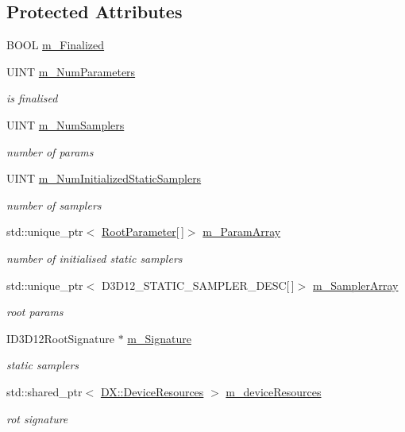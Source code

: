 \subsection*{Protected Attributes}
\begin{DoxyCompactItemize}
\item 
B\+O\+OL \mbox{\hyperlink{class_root_signature_a87564a512da9c0d3d6ca159dca0bc52b}{m\+\_\+\+Finalized}}
\item 
U\+I\+NT \mbox{\hyperlink{class_root_signature_a2f4c499d12d76b357853b100ebb6d8fa}{m\+\_\+\+Num\+Parameters}}
\begin{DoxyCompactList}\small\item\em is finalised \end{DoxyCompactList}\item 
U\+I\+NT \mbox{\hyperlink{class_root_signature_a1c558da623e1304988f56e78e957ac34}{m\+\_\+\+Num\+Samplers}}
\begin{DoxyCompactList}\small\item\em number of params \end{DoxyCompactList}\item 
U\+I\+NT \mbox{\hyperlink{class_root_signature_a4512fb5980e654113a04e4aff00e8bd7}{m\+\_\+\+Num\+Initialized\+Static\+Samplers}}
\begin{DoxyCompactList}\small\item\em number of samplers \end{DoxyCompactList}\item 
std\+::unique\+\_\+ptr$<$ \mbox{\hyperlink{class_root_parameter}{Root\+Parameter}}\mbox{[}$\,$\mbox{]}$>$ \mbox{\hyperlink{class_root_signature_a4b0c1a56f8fe468fc8ca30dccf490eaa}{m\+\_\+\+Param\+Array}}
\begin{DoxyCompactList}\small\item\em number of initialised static samplers \end{DoxyCompactList}\item 
std\+::unique\+\_\+ptr$<$ D3\+D12\+\_\+\+S\+T\+A\+T\+I\+C\+\_\+\+S\+A\+M\+P\+L\+E\+R\+\_\+\+D\+E\+SC\mbox{[}$\,$\mbox{]}$>$ \mbox{\hyperlink{class_root_signature_a7fea24906a1437ca55aaac9a8f6cc2f4}{m\+\_\+\+Sampler\+Array}}
\begin{DoxyCompactList}\small\item\em root params \end{DoxyCompactList}\item 
I\+D3\+D12\+Root\+Signature $\ast$ \mbox{\hyperlink{class_root_signature_a9c2454e65f7e2512952ab74c967572d3}{m\+\_\+\+Signature}}
\begin{DoxyCompactList}\small\item\em static samplers \end{DoxyCompactList}\item 
std\+::shared\+\_\+ptr$<$ \mbox{\hyperlink{class_d_x_1_1_device_resources}{D\+X\+::\+Device\+Resources}} $>$ \mbox{\hyperlink{class_root_signature_a6232742884741b5e773d00fee5e9c4ba}{m\+\_\+device\+Resources}}
\begin{DoxyCompactList}\small\item\em rot signature \end{DoxyCompactList}\end{DoxyCompactItemize}


